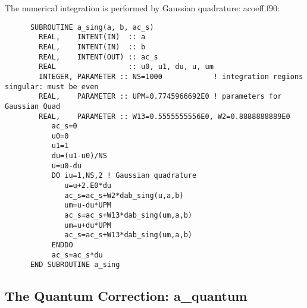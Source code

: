 \documentclass[preprint,12pt,eqsecnum,nofootinbib,amsmath,amssymb]{revtex4}
\begin{document}
{{\noindent
The numerical integration is performed by Gaussian quadrature:
\vskip0.4cm 
\noindent
acoeff.f90:
{
\baselineskip 10pt
\begin{verbatim}
      SUBROUTINE a_sing(a, b, ac_s)
        REAL,    INTENT(IN)  :: a
        REAL,    INTENT(IN)  :: b
        REAL,    INTENT(OUT) :: ac_s
        REAL                 :: u0, u1, du, u, um
        INTEGER, PARAMETER :: NS=1000            ! integration regions singular: must be even
        REAL,    PARAMETER :: UPM=0.7745966692E0 ! parameters for Gaussian Quad
        REAL,    PARAMETER :: W13=0.5555555556E0, W2=0.8888888889E0
           ac_s=0
           u0=0
           u1=1
           du=(u1-u0)/NS
           u=u0-du
           DO iu=1,NS,2 ! Gaussian quadrature
              u=u+2.E0*du
              ac_s=ac_s+W2*dab_sing(u,a,b)
              um=u-du*UPM
              ac_s=ac_s+W13*dab_sing(um,a,b)
              um=u+du*UPM
              ac_s=ac_s+W13*dab_sing(um,a,b)
           ENDDO
           ac_s=ac_s*du
      END SUBROUTINE a_sing
\end{verbatim}
}


\subsection{The Quantum Correction: a\_quantum}

}}
\end{document}
